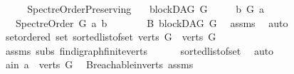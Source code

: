 \begin{isabellebody}
\ \ \isamarkupfalse%
\ \isanewline
{}\isamarkupfalse%
%
\endisatagproof
{\isafoldproof}%
%
\isadelimproof
\isanewline
%
\endisadelimproof
\isanewline
\isanewline
\isanewline
{}\isamarkupfalse%
\ Spectre{\isacharunderscore}{\kern0pt}Order{\isacharunderscore}{\kern0pt}Preserving{\isacharcolon}{\kern0pt}\isanewline
\ \ \ {\isachardoublequoteopen}blockDAG\ G{\isachardoublequoteclose}\isanewline
\ \ \ \ \ {\isachardoublequoteopen}b\ {\isasymrightarrow}\isactrlsup {\isacharplus}{\kern0pt}\isactrlbsub G\isactrlesub \ a{\isachardoublequoteclose}\isanewline
\ \ \ {\isachardoublequoteopen}Spectre{\isacharunderscore}{\kern0pt}Order\ G\ a\ b{\isachardoublequoteclose}\ \isanewline
%
\isadelimproof
%
\endisadelimproof
%
\isatagproof
{}\isamarkupfalse%
\ {\isacharminus}{\kern0pt}\ \isanewline
\ \ \isamarkupfalse%
\ B{\isacharcolon}{\kern0pt}\ blockDAG\ {\isachardoublequoteopen}G{\isachardoublequoteclose}\ \isamarkupfalse%
\ assms{\isacharparenleft}{\kern0pt}{}{\isacharparenright}{\kern0pt}\ \isamarkupfalse%
\ auto\isanewline
\ \ \isamarkupfalse%
\ set{\isacharunderscore}{\kern0pt}ordered{\isacharcolon}{\kern0pt}\ {\isachardoublequoteopen}set\ {\isacharparenleft}{\kern0pt}sorted{\isacharunderscore}{\kern0pt}list{\isacharunderscore}{\kern0pt}of{\isacharunderscore}{\kern0pt}set\ {\isacharparenleft}{\kern0pt}verts\ G{\isacharparenright}{\kern0pt}{\isacharparenright}{\kern0pt}\ {\isacharequal}{\kern0pt}\ verts\ G{\isachardoublequoteclose}\isanewline
\ \ \ \ \isamarkupfalse%
\ assms{\isacharparenleft}{\kern0pt}{}{\isacharparenright}{\kern0pt}\ subs\ fin{\isacharunderscore}{\kern0pt}digraph{\isachardot}{\kern0pt}finite{\isacharunderscore}{\kern0pt}verts\isanewline
\ \ \ \ \ \ sorted{\isacharunderscore}{\kern0pt}list{\isacharunderscore}{\kern0pt}of{\isacharunderscore}{\kern0pt}set\ \isamarkupfalse%
\ auto\isanewline
\ \ \isamarkupfalse%
\ a{\isacharunderscore}{\kern0pt}in{\isacharcolon}{\kern0pt}\ {\isachardoublequoteopen}a\ {\isasymin}\ verts\ G{\isachardoublequoteclose}\ \isamarkupfalse%
\ B{\isachardot}{\kern0pt}reachable{}{\isacharunderscore}{\kern0pt}in{\isacharunderscore}{\kern0pt}verts{\isacharparenleft}{\kern0pt}{}{\isacharparenright}{\kern0pt}\ assms{\isacharparenleft}{\kern0pt}{}{\isacharparenright}{\kern0pt}\isanewline
\ \ \ \ \isamarkupfalse%

\end{isabellebody}
